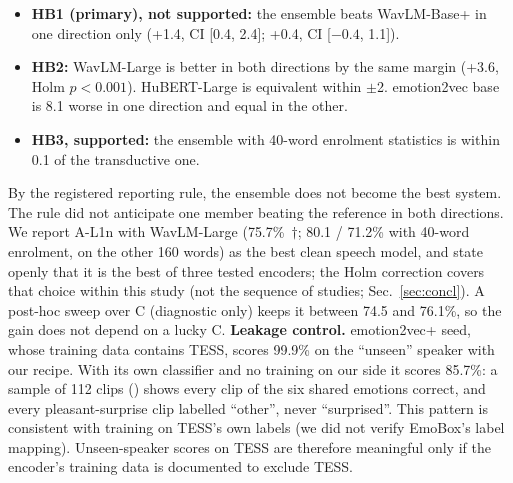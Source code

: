 \begin{itemize}\setlength\itemsep{1pt}
\item \textbf{HB1 (primary), not supported:} the ensemble beats WavLM-Base+ in one direction only (+1.4\pp, CI [0.4, 2.4]; +0.4\pp, CI [$-0.4$, 1.1]).
\item \textbf{HB2:} WavLM-Large is better in both directions by the same margin (+3.6\pp, Holm $p<0.001$). HuBERT-Large is equivalent within $\pm$2\pp. emotion2vec base is 8.1\pp{} worse in one direction and equal in the other.
\item \textbf{HB3, supported:} the ensemble with 40-word enrolment statistics is within 0.1\pp{} of the transductive one.
\end{itemize}
By the registered reporting rule, the ensemble does not become the best system. The rule did not anticipate one member beating the reference in both directions. We report A-L1n with WavLM-Large (75.7\%~$\dagger$; 80.1 / 71.2\% with 40-word enrolment, on the other 160 words) as the best clean speech model, and state openly that it is the best of three tested encoders; the Holm correction covers that choice within this study (not the sequence of studies; Sec.~\ref{sec:concl}). A post-hoc sweep over C (diagnostic only) keeps it between 74.5 and 76.1\%, so the gain does not depend on a lucky C.
\textbf{Leakage control.} emotion2vec+ seed, whose training data contains TESS, scores 99.9\% on the ``unseen'' speaker with our recipe. With its own classifier and no training on our side it scores 85.7\%: a sample of 112 clips () shows every clip of the six shared emotions correct, and every pleasant-surprise clip labelled ``other'', never ``surprised''. This pattern is consistent with training on TESS's own labels (we did not verify EmoBox's label mapping). Unseen-speaker scores on TESS are therefore meaningful only if the encoder's training data is documented to exclude TESS.

